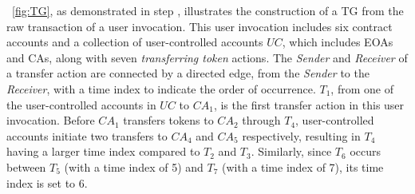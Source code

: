 
\myfig~\ref{fig:TG}, as demonstrated in step , illustrates the construction of a TG from the raw transaction of a user invocation. This user invocation includes six contract accounts and a collection of user-controlled accounts $UC$, which includes EOAs and CAs, along with seven \textit{transferring token} actions.
The \textit{Sender} and \textit{Receiver} of a transfer action are connected by a directed edge, from the \textit{Sender} to the \textit{Receiver}, with a time index to indicate the order of occurrence.
$T_1$, from one of the user-controlled accounts in $UC$ to $CA_1$, is the first transfer action in this user invocation.
Before $CA_1$ transfers tokens to $CA_2$ through $T_4$, user-controlled accounts initiate two transfers to $CA_4$ and $CA_5$ respectively, resulting in $T_4$ having a larger time index compared to $T_2$ and $T_3$.
Similarly, since $T_6$ occurs between $T_5$ (with a time index of 5) and $T_7$ (with a time index of 7), its time index is set to 6.

